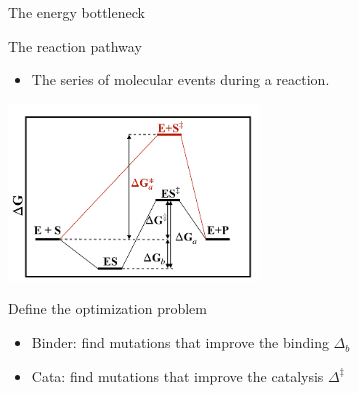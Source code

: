 \documentclass[presentation,smaller]{beamer}
\begin{document}
\begin{frame}[label={sec:org03e45df}]{The energy bottleneck}
\begin{block}{The reaction pathway}
\begin{itemize}
\item The series of molecular events during a reaction.
\end{itemize}

\begin{center}
\includegraphics[width=0.5\textwidth]{./img/reaction_pathway.png}
\end{center}
\end{block}

\begin{block}{Define the optimization problem}
\begin{itemize}
\item Binder: find mutations that improve the binding \(\Delta_{b}\)
\item Cata: find mutations that improve the catalysis \(\Delta^{\ddagger}\)
\end{itemize}
\end{block}
\end{frame}
\end{document}
